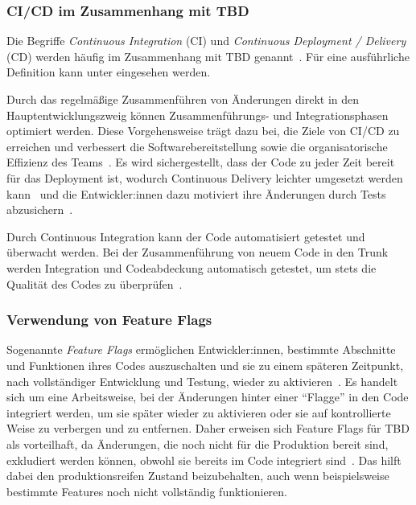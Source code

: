 \subsubsection{CI/CD im Zusammenhang mit TBD}
\label{trunk:cicd}

Die Begriffe \emph{Continuous Integration} (CI) und \emph{Continuous Deployment / Delivery} (CD) werden häufig im Zusammenhang mit TBD genannt~\cite{trunkbased1,trunkbased2,trunkbased3}. Für eine ausführliche Definition kann unter \cite{trunkbased_cicd1} eingesehen werden.

Durch das regelmäßige Zusammenführen von Änderungen direkt in den Hauptentwicklungszweig können Zusammenführungs- und Integrationsphasen optimiert werden. Diese Vorgehensweise trägt dazu bei, die Ziele von CI/CD zu erreichen und verbessert die Softwarebereitstellung sowie die organisatorische Effizienz des Teams~\cite{trunkbased4}. Es wird sichergestellt, dass der Code zu jeder Zeit bereit für das Deployment ist, wodurch Continuous Delivery leichter umgesetzt werden kann~\cite{trunkbased5} und die Entwickler:innen dazu motiviert ihre Änderungen durch Tests abzusichern~\cite{trunkbased2}.

Durch Continuous Integration kann der Code automatisiert getestet und überwacht werden. Bei der Zusammenführung von neuem Code in den Trunk werden Integration und Codeabdeckung automatisch getestet, um stets die Qualität des Codes zu überprüfen~\cite{trunkbased4}.

\subsubsection{Verwendung von Feature Flags}
\label{trunk:ff}

Sogenannte \emph{Feature Flags} ermöglichen Entwickler:innen, bestimmte Abschnitte und Funktionen ihres Codes auszuschalten und sie zu einem späteren Zeitpunkt, nach vollständiger Entwicklung und Testung, wieder zu aktivieren~\cite{trunkbased_featureflag2}. Es handelt sich um eine Arbeitsweise, bei der Änderungen hinter einer \enquote{Flagge} in den Code integriert werden, um sie später wieder zu aktivieren oder sie auf kontrollierte Weise zu verbergen und zu entfernen. Daher erweisen sich Feature Flags für TBD als vorteilhaft, da Änderungen, die noch nicht für die Produktion bereit sind, exkludiert werden können, obwohl sie bereits im Code integriert sind~\cite{trunkbased_featureflag1}. Das hilft dabei den produktionsreifen Zustand beizubehalten, auch wenn beispielsweise bestimmte Features noch nicht vollständig funktionieren.

